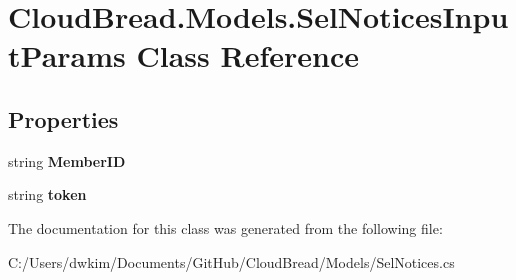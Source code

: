 \hypertarget{a00102}{}\section{Cloud\+Bread.\+Models.\+Sel\+Notices\+Input\+Params Class Reference}
\label{a00102}
\subsection*{Properties}
\begin{DoxyCompactItemize}
\item 
string {\bfseries Member\+ID}\hypertarget{a00102_a94b0d0349e2d593fb08f1daec6990544}{}\label{a00102_a94b0d0349e2d593fb08f1daec6990544}

\item 
string {\bfseries token}\hypertarget{a00102_a275caf9405bdbaefb3c72ad6c53154b8}{}\label{a00102_a275caf9405bdbaefb3c72ad6c53154b8}

\end{DoxyCompactItemize}


The documentation for this class was generated from the following file\+:\begin{DoxyCompactItemize}
\item 
C\+:/\+Users/dwkim/\+Documents/\+Git\+Hub/\+Cloud\+Bread/\+Models/Sel\+Notices.\+cs\end{DoxyCompactItemize}
